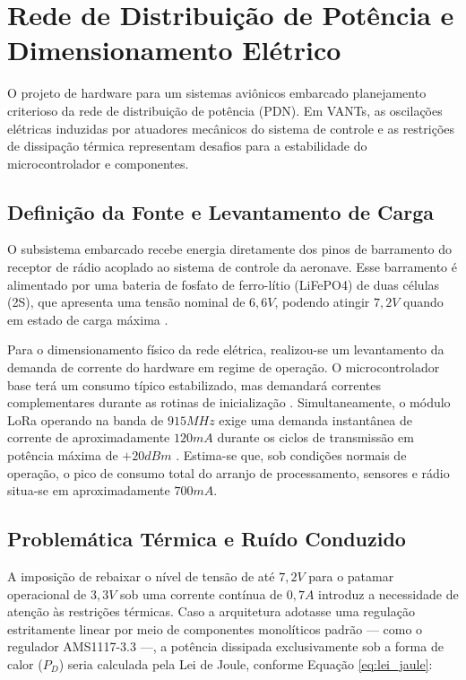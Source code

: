 \section{Rede de Distribuição de Potência e Dimensionamento Elétrico}
O projeto de hardware para um sistemas aviônicos embarcado planejamento criterioso da rede de distribuição de potência (PDN). Em VANTs, as oscilações elétricas induzidas por atuadores mecânicos do sistema de controle e as restrições de dissipação térmica representam desafios para a estabilidade do microcontrolador e componentes.

\subsection{Definição da Fonte e Levantamento de Carga}
O subsistema embarcado recebe energia diretamente dos pinos de barramento do receptor de rádio acoplado ao sistema de controle da aeronave. Esse barramento é alimentado por uma bateria de fosfato de ferro-lítio (LiFePO4) de duas células (2S), que apresenta uma tensão nominal de $6,6 V$, podendo atingir $7,2 V$ quando em estado de carga máxima \cite{linden2010handbook}.

Para o dimensionamento físico da rede elétrica, realizou-se um levantamento da demanda de corrente do hardware em regime de operação. O microcontrolador base terá um consumo típico estabilizado, mas demandará correntes complementares durante as rotinas de inicialização \cite{esp32_datasheet}. Simultaneamente, o módulo LoRa operando na banda de $915 MHz$ exige uma demanda instantânea de corrente de aproximadamente $120 mA$ durante os ciclos de transmissão em potência máxima de $+20 dBm$ \cite{sx1276_datasheet}. Estima-se que, sob condições normais de operação, o pico de consumo total do arranjo de processamento, sensores e rádio situa-se em aproximadamente $700 mA$.

\subsection{Problemática Térmica e Ruído Conduzido}

A imposição de rebaixar o nível de tensão de até $7,2 V$ para o patamar operacional de $3,3 V$ sob uma corrente contínua de $0,7 A$ introduz a necessidade de atenção às restrições térmicas. Caso a arquitetura adotasse uma regulação estritamente linear por meio de componentes monolíticos padrão — como o regulador AMS1117-3.3 —, a potência dissipada exclusivamente sob a forma de calor ($P_D$) seria calculada pela Lei de Joule, conforme Equação \ref{eq:lei_jaule}:

